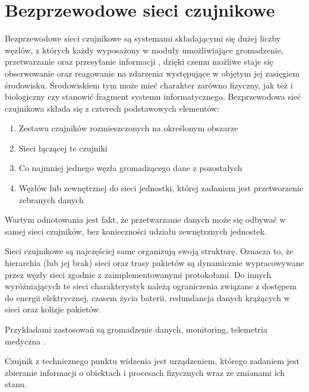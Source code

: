 \chapter{Bezprzewodowe sieci czujnikowe}
Bezprzewodowe sieci czujnikowe są systemami składającymi się dużej liczby węzłów, z których każdy wyposażony w moduły umożliwiające gromadzenie, przetwarzanie oraz przesyłanie informacji \cite{Ilyas2004}, dzięki czemu możliwe staje się obserwowanie oraz reagowanie na zdarzenia występujące w objętym jej zasięgiem środowisku. Środowiskiem tym może mieć charakter zarówno fizyczny, jak też i biologiczny czy stanowić fragment systemu informatycznego. 
\cite{Sohraby2006}
Bezprzewodowa sieć czujnikowa składa się z czterech podstawowych elementów\cite{}:
\begin{enumerate}
	\item Zestawu czujników rozmieszczonych na określonym obszarze
	\item Sieci łączącej te czujniki
	\item Co najmniej jednego węzła gromadzącego dane z pozostałych
	\item Węzłów lub zewnętrznej do sieci jednostki, której zadaniem jest przetworzenie zebranych danych
\end{enumerate}
Wartym odnotowania jest fakt, że przetwarzanie danych może się odbywać w samej sieci czujników, bez konieczności udziału zewnętrznych jednostek.

Sieci czujnikowe są najczęściej same organizują swoją strukturę. Oznacza to, że hierarchia (lub jej brak) sieci oraz trasy pakietów są dynamicznie wypracowywane przez węzły sieci zgodnie z zaimplementowanymi protokołami.
Do innych wyróżniających te sieci charakterystyk należą ograniczenia związane z dostępem do energii elektrycznej, czasem życia baterii, redundancja danych krążących w sieci oraz kolizje pakietów.

Przykładami zastosowań są gromadzenie danych, monitoring, telemetria medyczna \cite{Biradar2009}.

Czujnik z technicznego punktu widzenia jest urządzeniem, którego zadaniem jest zbieranie informacji o obiektach i procesach fizycznych wraz ze zmianami ich stanu.\cite{Dargie2010}

